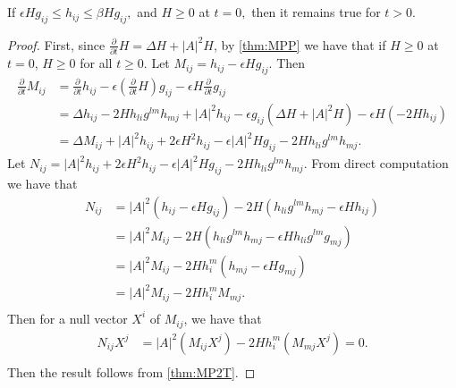\begin{theorem} \label{stpin}
	If $\epsilon H g_{ij }^{} \leq h_{ij }^{} \leq \beta H g_{ij }^{} ,$ and $H \geq 0$ at $t=0,$ then it remains true for $t>0$.
\end{theorem}
\begin{proof}
	First, since $\frac{\partial }{\partial t} H=\Delta H+ \left| A \right| ^2 H$, by \autoref{thm:MPP} we have that if $H \geq 0$ at $t=0$, $H \geq 0$ for all $t \geq 0$.
	Let $M_{ij }^{} = h_{ij }^{} - \epsilon H g_{ij }^{} .$ Then
	\begin{equation*}
	\begin{split}
		\frac{\partial }{\partial t} M_{ij }^{}  
	&= \frac{\partial }{\partial t} h_{ij }^{} -\epsilon (\frac{\partial }{\partial t} H) g_{ij }^{} - \epsilon H \frac{\partial }{\partial t} g_{ij }^{}  \\
	&= \Delta h_{ij}^{} - 2 H h_{li }^{} g_{}^{lm } h_{mj}^{} + \left| A \right| ^2 h_{ij}^{}-\epsilon g_{ij }^{} (\Delta H+ \left| A \right| ^2 H)-\epsilon H(-2H h_{ij }^{} )\\
	&= \Delta M_{ij }^{} + \left| A \right| ^{2}h_{ij }^{} + 2 \epsilon H^2 h_{ij }^{} - \epsilon \left| A \right| ^2 H g_{ij }^{} - 2 H h_{li }^{} g_{}^{lm } h_{mj}^{}.
	\end{split}
	\end{equation*}
	Let $N_{ij }^{} = \left| A \right| ^{2}h_{ij }^{} + 2 \epsilon H^2 h_{ij }^{} - \epsilon \left| A \right| ^2 H g_{ij }^{} - 2 H h_{li }^{} g_{}^{lm } h_{mj}^{}$. From direct computation we have that 
	\begin{equation*}
	\begin{split}
		N_{ij }^{} 
		&= \left| A \right| ^2(h_{ij }^{} -\epsilon H g_{ij }^{} )-2H(h_{li }^{} g_{}^{lm } h_{mj}^{}-\epsilon H h_{ij }^{} )\\
		&= \left|A \right| ^2 M_{ij }^{} -2H(h_{li }^{} g_{}^{lm } h_{mj}^{}-\epsilon H h_{li }^{} g_{}^{lm} g_{mj }^{} )\\
		&= \left|A \right| ^2 M_{ij }^{} -2H h_{i}^{m} (h_{mj }^{}-\epsilon H  g_{mj }^{} )\\
		&= \left|A \right| ^2 M_{ij }^{} -2H h_{i}^{m} M_{ mj}^{}. \\
	\end{split}
	\end{equation*}  
	Then for a null vector $X^i$ of $M_{ij }^{} $, we have that
	\begin{equation*}
	\begin{split}
		N_{ij }^{} X^j 
	&= \left|A \right| ^2 (M_{ij }^{}X^j) -2H h_{i}^{m} (M_{ mj}^{} X^j)=0.\\
	\end{split}
	\end{equation*}
	Then the result follows from \autoref{thm:MP2T}.
\end{proof}

